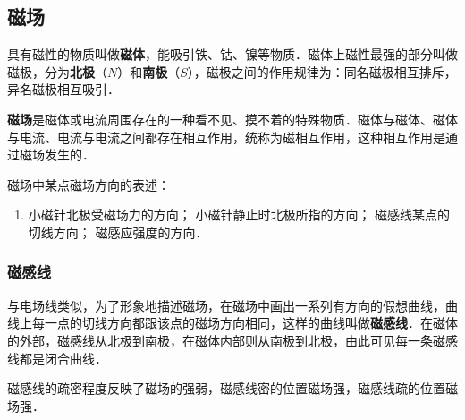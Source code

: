 
\subsection{磁场}

具有磁性的物质叫做\textbf{磁体}，能吸引铁、钴、镍等物质．磁体上磁性最强的部分叫做磁极，分为\textbf{北极}（$N$）和\textbf{南极}（$S$），磁极之间的作用规律为：同名磁极相互排斥，异名磁极相互吸引．

\textbf{磁场}是磁体或电流周围存在的一种看不见、摸不着的特殊物质．磁体与磁体、磁体与电流、电流与电流之间都存在相互作用，统称为磁相互作用，这种相互作用是通过磁场发生的．

磁场中某点磁场方向的表述：

\begin{enumerate}
\item 小磁针北极受磁场力的方向；
小磁针静止时北极所指的方向；
磁感线某点的切线方向；
磁感应强度的方向．
\end{enumerate}

\subsubsection{磁感线}
与电场线类似，为了形象地描述磁场，在磁场中画出一系列有方向的假想曲线，曲线上每一点的切线方向都跟该点的磁场方向相同，这样的曲线叫做\textbf{磁感线}．在磁体的外部，磁感线从北极到南极，在磁体内部则从南极到北极，由此可见每一条磁感线都是闭合曲线．

磁感线的疏密程度反映了磁场的强弱，磁感线密的位置磁场强，磁感线疏的位置磁场强．
